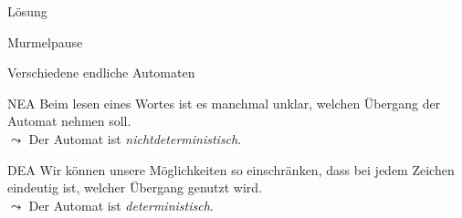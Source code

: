 \documentclass[10pt]{beamer}
\begin{document}
{
\begin{frame}{Lösung}
\end{frame}
}

\begin{frame}[standout]
  Murmelpause
\end{frame}

\begin{frame}[fragile]{Verschiedene endliche Automaten}
\begin{alertblock}{NEA}
Beim lesen eines Wortes ist es manchmal unklar, welchen Übergang der Automat nehmen soll.\\
$\leadsto$ Der Automat ist \emph{\alert{nichtdeterministisch}}.
\end{alertblock}
\begin{alertblock}{DEA}
Wir können unsere Möglichkeiten so einschränken, dass bei jedem Zeichen eindeutig ist, welcher Übergang genutzt wird.\\
$\leadsto$ Der Automat ist \alert{\emph{deterministisch}}.
\end{alertblock}
\end{frame}
\end{document}
